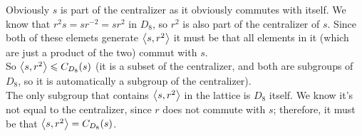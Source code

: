\documentclass[12pt]{article}
\begin{document}
    Obviously $s$ is part of the centralizer
    as it obviously commutes with itself.
    We know that $r^2s = sr^{-2} = sr^2$ in $D_8$,
    so $r^2$ is also part of the centralizer of $s$.
    Since both of these elemets generate $\left\langle s, r^2 \right\rangle$
    it must be that all elements in it
    (which are just a product of the two)
    commut with $s$. \\
    So $\left\langle s, r^2 \right\rangle \leqslant C_{D_8}(s)$
    (it is a subset of the centralizer,
    and both are subgroups of $D_8$,
    so it is automatically a subgroup of the centralizer). \\
    The only subgroup that contains $\left\langle s, r^2 \right\rangle$
    in the lattice is $D_8$ itself.
    We know it's not equal to the centralizer,
    since $r$ does not commute with $s$;
    therefore, it must be that $\left\langle s, r^2 \right\rangle = C_{D_8}(s)$. \\
\end{document}
